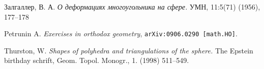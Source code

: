\documentclass{compositio}
\begin{document}
\begin{thebibliography}{52}
\begin{otherlanguage}{russian}
 Залгаллер, В. А.
\textit{О деформациях многоугольника на сфере.}
УМН, 11:5(71) (1956),  177--178
\end{otherlanguage}

Petrunin A.
\emph{Exercises in orthodox geometry},
{\tt arXiv:0906.0290 [math.HO]}.

 Thurston, W. \textit{Shapes of polyhedra and triangulations of the sphere.} 
The Epstein birthday schrift,  Geom. Topol. Monogr., 1. (1998) 511--549.


\end{thebibliography}
\end{document}
